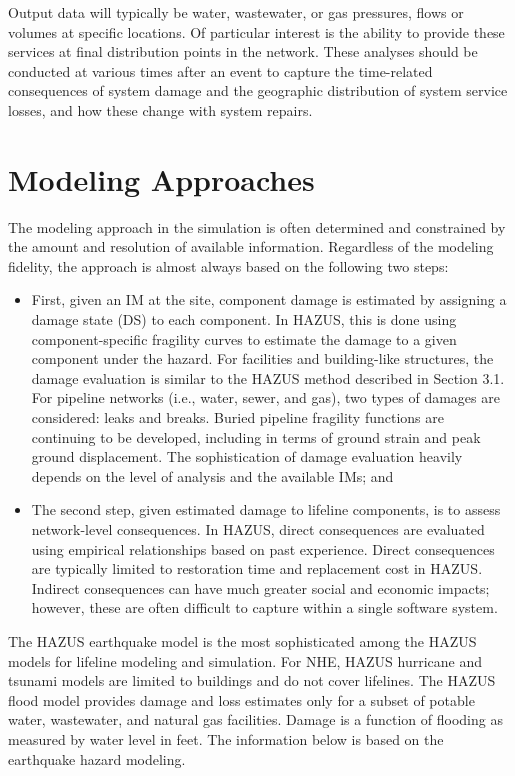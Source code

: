 Output data will typically be water, wastewater, or gas pressures, flows or volumes at specific locations. Of particular interest is the ability to provide these services at final distribution points in the network. These analyses should be conducted at various times after an event to capture the time-related consequences of system damage and the geographic distribution of system service losses, and how these change with system repairs.

\section{Modeling Approaches}
\label{sec:perf_pipeline_methods}

The modeling approach in the simulation is often determined and constrained by the amount and resolution of available information. Regardless of the modeling fidelity, the approach is almost always based on the following two steps: 

\begin{itemize}
    \item First, given an IM at the site, component damage is estimated by assigning a damage state (DS) to each component. In HAZUS, this is done using component-specific fragility curves to estimate the damage to a given component under the hazard. For facilities and building-like structures, the damage evaluation is similar to the HAZUS method described in Section 3.1. For pipeline networks (i.e., water, sewer, and gas), two types of damages are considered: leaks and breaks. Buried pipeline fragility functions are continuing to be developed, including in terms of ground strain and peak ground displacement. The sophistication of damage evaluation heavily depends on the level of analysis and the available IMs; and
    \item The second step, given estimated damage to lifeline components, is to assess network-level consequences. In HAZUS, direct consequences are evaluated using empirical relationships based on past experience. Direct consequences are typically limited to restoration time and replacement cost in HAZUS. Indirect consequences can have much greater social and economic impacts; however, these are often difficult to capture within a single software system.
\end{itemize}

The HAZUS earthquake model is the most sophisticated among the HAZUS models for lifeline modeling and simulation. For NHE, HAZUS hurricane and tsunami models are limited to buildings and do not cover lifelines. The HAZUS flood model provides damage and loss estimates only for a subset of potable water, wastewater, and natural gas facilities. Damage is a function of flooding as measured by water level in feet. The information below is based on the earthquake hazard modeling.

